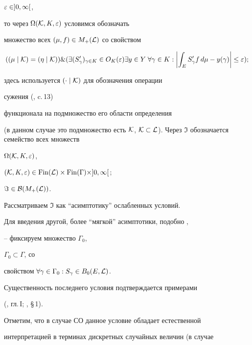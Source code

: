 $\varepsilon \in ]0, \infty[$,


то через $\Omega({\cal K}, K, \varepsilon)$ условимся обозначать


множество всех $(\mu, f) \in M_+({\cal L})$ со свойством


%


\begin{equation}


((\mu \mid {\cal K}) = (\eta \mid {\cal K}))


\& (\exists (S'_\gamma)_{\gamma \in K} \in O_K(\var)


\exists y \in Y \; \forall \gamma \in K:


\biggl|\int_E S'_\gamma f\,d\mu - y(\gamma)\biggr| \le \var);


\end{equation}


%


здесь используется $(\cdot \mid {\cal K})$ для обозначения операции


сужения (\cite{Dun}, c.\,13)


функционала на подмножество его области определения


(в данном случае это подмножество есть ${\cal K}$, ${\cal K} \subset


{\cal L}$). Через $\Im$ обозначается семейство всех множеств


$\Omega({\cal K}, K, \varepsilon)$,


$({\cal K}, K, \var) \in \Fin({\cal L})


\times \Fin(\Gamma) \times ]0,\infty[$;


$\Im \in {\cal B}(M_+({\cal L}))$. 


Рассматриваем $\Im$ как ``асимптотику'' ослабленных условий.


Для введения другой, более ``мягкой'' асимптотики, подобно \cite{Ch1}, 


\cite{Ch2}--\cite{Ch4} фиксируем множество $\Gamma_0$,


$\Gamma_0 \subset \Gamma$, со


свойством $\forall \gamma \in \Gamma_0: S_\gamma \in B_0(E, {\cal L})$.


Существенность последнего условия подтверждается примерами


(\cite{Ch1}, гл.\,I; \cite{Ch3}, \S\,1).


Отметим, что в случае СО данное условие обладает естественной


интерпретацией в терминах дискретных случайных величин (в случае


